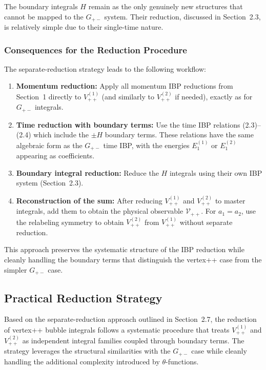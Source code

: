 \documentclass[a4paper,12pt]{article}
\begin{document}
The boundary integrals $H$ remain as the only genuinely new structures that cannot be mapped to the $G_{+-}$ system. Their reduction, discussed in Section~2.3, is relatively simple due to their single-time nature.

\subsubsection{Consequences for the Reduction Procedure}

The separate-reduction strategy leads to the following workflow:

\begin{enumerate}
	\item \textbf{Momentum reduction:} Apply all momentum IBP reductions from Section~1 directly to $V_{++}^{(1)}$ (and similarly to $V_{++}^{(2)}$ if needed), exactly as for $G_{+-}$ integrals.

	\item \textbf{Time reduction with boundary terms:} Use the time IBP relations (2.3)--(2.4) which include the $\pm H$ boundary terms. These relations have the same algebraic form as the $G_{+-}$ time IBP, with the energies $E_1^{(1)}$ or $E_1^{(2)}$ appearing as coefficients.

	\item \textbf{Boundary integral reduction:} Reduce the $H$ integrals using their own IBP system (Section~2.3).

	\item \textbf{Reconstruction of the sum:} After reducing $V_{++}^{(1)}$ and $V_{++}^{(2)}$ to master integrals, add them to obtain the physical observable $\mathcal{V}_{++}$. For $a_1=a_2$, use the relabeling symmetry to obtain $V_{++}^{(2)}$ from $V_{++}^{(1)}$ without separate reduction.
\end{enumerate}

This approach preserves the systematic structure of the IBP reduction while cleanly handling the boundary terms that distinguish the vertex++ case from the simpler $G_{+-}$ case.

\subsection{Practical Reduction Strategy}

Based on the separate-reduction approach outlined in Section~2.7, the reduction of vertex++ bubble integrals follows a systematic procedure that treats $V_{++}^{(1)}$ and $V_{++}^{(2)}$ as independent integral families coupled through boundary terms. The strategy leverages the structural similarities with the $G_{+-}$ case while cleanly handling the additional complexity introduced by $\theta$-functions.
\end{document}
